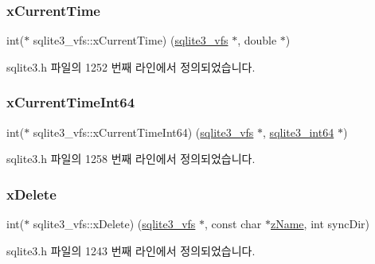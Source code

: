 \subsubsection{\texorpdfstring{x\+Current\+Time}{xCurrentTime}}
{\footnotesize\ttfamily int($\ast$ sqlite3\+\_\+vfs\+::x\+Current\+Time) (\hyperlink{structsqlite3__vfs}{sqlite3\+\_\+vfs} $\ast$, double $\ast$)}



sqlite3.\+h 파일의 1252 번째 라인에서 정의되었습니다.

\mbox{\label{structsqlite3__vfs_a2a344dbc5e4625343d992546fbff5421}} 
\subsubsection{\texorpdfstring{x\+Current\+Time\+Int64}{xCurrentTimeInt64}}
{\footnotesize\ttfamily int($\ast$ sqlite3\+\_\+vfs\+::x\+Current\+Time\+Int64) (\hyperlink{structsqlite3__vfs}{sqlite3\+\_\+vfs} $\ast$, \hyperlink{sqlite3_8h_a0a4d3e6c1ad46f90e746b920ab6ca0d2}{sqlite3\+\_\+int64} $\ast$)}



sqlite3.\+h 파일의 1258 번째 라인에서 정의되었습니다.

\mbox{\label{structsqlite3__vfs_a9a84baca80b7ab2da9fb147cb40c73d2}} 
\subsubsection{\texorpdfstring{x\+Delete}{xDelete}}
{\footnotesize\ttfamily int($\ast$ sqlite3\+\_\+vfs\+::x\+Delete) (\hyperlink{structsqlite3__vfs}{sqlite3\+\_\+vfs} $\ast$, const char $\ast$\hyperlink{structsqlite3__vfs_a0f06a27ac2201ea04c0623ef19e5d73e}{z\+Name}, int sync\+Dir)}



sqlite3.\+h 파일의 1243 번째 라인에서 정의되었습니다.

\mbox{\label{structsqlite3__vfs_a0cbdab1584e0e2a80b32b2c335f17f99}} 
